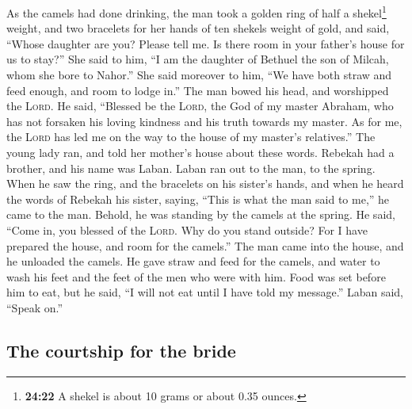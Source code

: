  As the camels had done drinking, the man took a golden
ring of half a shekel\footnote{\textbf{24:22} A shekel is about 10 grams
  or about 0.35 ounces.} weight, and two bracelets for her hands of ten
shekels weight of gold,  and said, ``Whose daughter are
you? Please tell me. Is there room in your father's house for us to
stay?''  She said to him, ``I am the daughter of Bethuel
the son of Milcah, whom she bore to Nahor.''  She said
moreover to him, ``We have both straw and feed enough, and room to lodge
in.''  The man bowed his head, and worshipped the
\textsc{Lord}.  He said, ``Blessed be the \textsc{Lord},
the God of my master Abraham, who has not forsaken his loving kindness
and his truth towards my master. As for me, the \textsc{Lord} has led me
on the way to the house of my master's relatives.''  The
young lady ran, and told her mother's house about these words.
 Rebekah had a brother, and his name was Laban. Laban ran
out to the man, to the spring.  When he saw the ring, and
the bracelets on his sister's hands, and when he heard the words of
Rebekah his sister, saying, ``This is what the man said to me,'' he came
to the man. Behold, he was standing by the camels at the spring.
 He said, ``Come in, you blessed of the \textsc{Lord}.
Why do you stand outside? For I have prepared the house, and room for
the camels.''  The man came into the house, and he
unloaded the camels. He gave straw and feed for the camels, and water to
wash his feet and the feet of the men who were with him. 
Food was set before him to eat, but he said, ``I will not eat until I
have told my message.'' Laban said, ``Speak on.''

\hypertarget{the-courtship-for-the-bride}{%
\subsection{The courtship for the
bride}\label{the-courtship-for-the-bride}}

